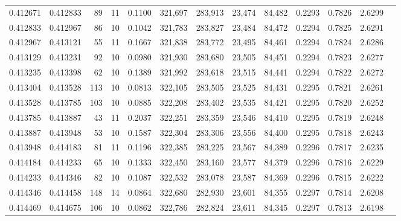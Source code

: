 \begin{tabular}{rrrrrrrrrrrrr}
0.412671 & 0.412833 &    89 &  11 &                                     0.1100 & 321,697 & 283,913 &  23,474 &  84,482 & 0.2293 & 0.7826 & 2.6299 \\
0.412833 & 0.412967 &    86 &  10 &                                     0.1042 & 321,783 & 283,827 &  23,484 &  84,472 & 0.2294 & 0.7825 & 2.6291 \\
0.412967 & 0.413121 &    55 &  11 &                                     0.1667 & 321,838 & 283,772 &  23,495 &  84,461 & 0.2294 & 0.7824 & 2.6286 \\
0.413129 & 0.413231 &    92 &  10 &                                     0.0980 & 321,930 & 283,680 &  23,505 &  84,451 & 0.2294 & 0.7823 & 2.6277 \\
0.413235 & 0.413398 &    62 &  10 &                                     0.1389 & 321,992 & 283,618 &  23,515 &  84,441 & 0.2294 & 0.7822 & 2.6272 \\
0.413404 & 0.413528 &   113 &  10 &                                     0.0813 & 322,105 & 283,505 &  23,525 &  84,431 & 0.2295 & 0.7821 & 2.6261 \\
0.413528 & 0.413785 &   103 &  10 &                                     0.0885 & 322,208 & 283,402 &  23,535 &  84,421 & 0.2295 & 0.7820 & 2.6252 \\
0.413785 & 0.413887 &    43 &  11 &                                     0.2037 & 322,251 & 283,359 &  23,546 &  84,410 & 0.2295 & 0.7819 & 2.6248 \\
0.413887 & 0.413948 &    53 &  10 &                                     0.1587 & 322,304 & 283,306 &  23,556 &  84,400 & 0.2295 & 0.7818 & 2.6243 \\
0.413948 & 0.414183 &    81 &  11 &                                     0.1196 & 322,385 & 283,225 &  23,567 &  84,389 & 0.2296 & 0.7817 & 2.6235 \\
0.414184 & 0.414233 &    65 &  10 &                                     0.1333 & 322,450 & 283,160 &  23,577 &  84,379 & 0.2296 & 0.7816 & 2.6229 \\
0.414233 & 0.414346 &    82 &  10 &                                     0.1087 & 322,532 & 283,078 &  23,587 &  84,369 & 0.2296 & 0.7815 & 2.6222 \\
0.414346 & 0.414458 &   148 &  14 &                                     0.0864 & 322,680 & 282,930 &  23,601 &  84,355 & 0.2297 & 0.7814 & 2.6208 \\
0.414469 & 0.414675 &   106 &  10 &                                     0.0862 & 322,786 & 282,824 &  23,611 &  84,345 & 0.2297 & 0.7813 & 2.6198 \\

\end{tabular}
